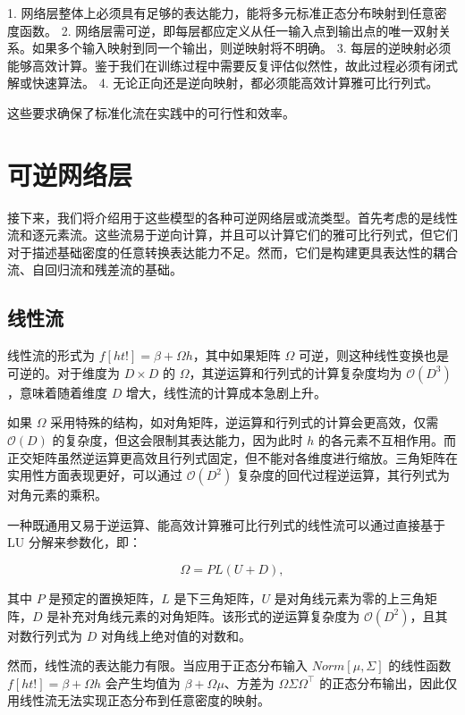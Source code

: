 \documentclass[lang=cn,newtx,10pt,scheme=chinese]{elegantbook}
\begin{document}
1. 网络层整体上必须具有足够的表达能力，能将多元标准正态分布映射到任意密度函数。
2. 网络层需可逆，即每层都应定义从任一输入点到输出点的唯一双射关系。如果多个输入映射到同一个输出，则逆映射将不明确。
3. 每层的逆映射必须能够高效计算。鉴于我们在训练过程中需要反复评估似然性，故此过程必须有闭式解或快速算法。
4. 无论正向还是逆向映射，都必须能高效计算雅可比行列式。

这些要求确保了标准化流在实践中的可行性和效率。
\section{可逆网络层}

接下来，我们将介绍用于这些模型的各种可逆网络层或流类型。首先考虑的是线性流和逐元素流。这些流易于逆向计算，并且可以计算它们的雅可比行列式，但它们对于描述基础密度的任意转换表达能力不足。然而，它们是构建更具表达性的耦合流、自回归流和残差流的基础。

\subsection{线性流}
线性流的形式为 \(f[ht!] = \beta + \Omega h\)，其中如果矩阵 \(\Omega\) 可逆，则这种线性变换也是可逆的。对于维度为 \(D \times D\) 的 \(\Omega\)，其逆运算和行列式的计算复杂度均为 \(\mathcal{O}(D^3)\)，意味着随着维度 \(D\) 增大，线性流的计算成本急剧上升。

如果 \(\Omega\) 采用特殊的结构，如对角矩阵，逆运算和行列式的计算会更高效，仅需 \(\mathcal{O}(D)\) 的复杂度，但这会限制其表达能力，因为此时 \(h\) 的各元素不互相作用。而正交矩阵虽然逆运算更高效且行列式固定，但不能对各维度进行缩放。三角矩阵在实用性方面表现更好，可以通过 \(\mathcal{O}(D^2)\) 复杂度的回代过程逆运算，其行列式为对角元素的乘积。

一种既通用又易于逆运算、能高效计算雅可比行列式的线性流可以通过直接基于 LU 分解来参数化，即：

\begin{equation}
\Omega = PL(U + D), 
\end{equation}

其中 \(P\) 是预定的置换矩阵，\(L\) 是下三角矩阵，\(U\) 是对角线元素为零的上三角矩阵，\(D\) 是补充对角线元素的对角矩阵。该形式的逆运算复杂度为 \(\mathcal{O}(D^2)\)，且其对数行列式为 \(D\) 对角线上绝对值的对数和。

然而，线性流的表达能力有限。当应用于正态分布输入 \(Norm[\mu, \Sigma]\) 的线性函数 \(f[ht!] = \beta + \Omega h\) 会产生均值为 \(\beta + \Omega \mu\)、方差为 \(\Omega \Sigma \Omega^\top\) 的正态分布输出，因此仅用线性流无法实现正态分布到任意密度的映射。
\end{document}
